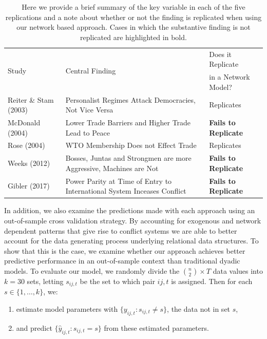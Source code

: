 \begin{table}[ht]
\centering
\caption{Here we provide a brief summary of the key variable in each of the five replications and a note about whether or not the finding is replicated when using our network based approach. Cases in which the substantive finding is not replicated are highlighted in bold.}
\begin{tabular}{l p{7cm} l} \toprule
\multirow{2}{*}{Study} & \multirow{2}{*}{Central Finding} & Does it Replicate \\ 
	& &  in a Network Model? \\ \toprule
Reiter \& Stam (2003) & Personalist Regimes Attack Democracies, Not Vice Versa & Replicates \\ \midrule
McDonald (2004) & Lower Trade Barriers and Higher Trade Lead to Peace & \textbf{Fails to Replicate} \\ \midrule
Rose (2004) & WTO Membership Does not Effect Trade & Replicates \\ \midrule
Weeks (2012) & Bosses, Juntas and Strongmen are more Aggressive, Machines are Not & \textbf{Fails to Replicate} \\\midrule
Gibler (2017) & Power Parity at Time of Entry to International System Inceases Conflict & \textbf{Fails to Replicate} \\ \bottomrule
	\end{tabular}
			\label{tab:modelFindingSumm}
\end{table}

In addition, we also examine the predictions made with each approach using an out-of-sample cross validation strategy. By accounting for exogenous and network dependent patterns that give rise to conflict systems we are able to better account for the data generating process underlying relational data structures. To show that this is the case, we examine whether our approach achieves better predictive performance in an out-of-sample context than traditional dyadic models. To evaluate our model, we randomly divide the $\binom n 2 \times T$ data values into $k=30$ sets, letting $s_{ij,t}$ be the set to which pair $ij,t$ is assigned. Then for each $s \in \{1,\ldots,k\}$, we:

\begin{enumerate}
	\item estimate model parameters with $\{y_{ij,t}: s_{ij,t} \neq s\}$, the data not in set $s$,
	\item and predict $\{\hat{y}_{ij,t}: s_{ij,t} = s\}$ from these estimated parameters. 
\end{enumerate}

